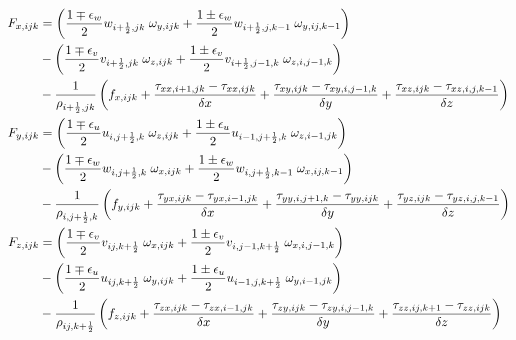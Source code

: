 \documentclass[11pt]{book}
\begin{document}
\begin{align}
F_{x,ijk} &=  \left(
 \frac{1\mp\epsilon_w}{2} w_{i+\frac{1}{2},jk} \; \omega_{y,ijk} +
 \frac{1\pm\epsilon_w}{2} w_{i+\frac{1}{2},j,k-1} \; \omega_{y,ij,k-1} \right) \nonumber \\
          &  - \left(
 \frac{1\mp\epsilon_v}{2} v_{i+\frac{1}{2},jk} \; \omega_{z,ijk} +
 \frac{1\pm\epsilon_v}{2} v_{i+\frac{1}{2},j-1,k} \; \omega_{z,i,j-1,k} \right) \nonumber\\
           &  - \frac{1}{\rho_{i+\frac{1}{2},jk}} \left( f_{x,ijk}
  + \frac{\tau_{xx,i+1,jk}-\tau_{xx,ijk}}{\delta x}
  + \frac{\tau_{xy,ijk}-\tau_{xy,i,j-1,k}}{\delta y}
  + \frac{\tau_{xz,ijk}-\tau_{xz,i,j,k-1}}{\delta z}  \right)  \\
F_{y,ijk} &= \left(
 \frac{1\mp\epsilon_u}{2} u_{i,j+\frac{1}{2},k} \; \omega_{z,ijk} +
 \frac{1\pm\epsilon_u}{2} u_{i-1,j+\frac{1}{2},k} \; \omega_{z,i-1,jk} \right) \nonumber \\
           &  - \left(
 \frac{1\mp\epsilon_w}{2} w_{i,j+\frac{1}{2},k} \; \omega_{x,ijk}+
 \frac{1\pm\epsilon_w}{2} w_{i,j+\frac{1}{2},k-1} \; \omega_{x,ij,k-1} \right) \nonumber \\
           &  - \frac{1}{\rho_{i,j+\frac{1}{2},k}} \left( f_{y,ijk}
  + \frac{\tau_{yx,ijk}-\tau_{yx,i-1,jk}}{\delta x}
  + \frac{\tau_{yy,i,j+1,k}-\tau_{yy,ijk}}{\delta y}
  + \frac{\tau_{yz,ijk}-\tau_{yz,i,j,k-1}}{\delta z} \right) \\
F_{z,ijk} &=  \left(
 \frac{1\mp\epsilon_v}{2} v_{ij,k+\frac{1}{2}} \; \omega_{x,ijk} +
 \frac{1\pm\epsilon_v}{2} v_{i,j-1,k+\frac{1}{2}} \; \omega_{x,i,j-1,k} \right)\nonumber \\
           &  -\left(
 \frac{1\mp\epsilon_u}{2} u_{ij,k+\frac{1}{2}} \; \omega_{y,ijk} +
 \frac{1\pm\epsilon_u}{2} u_{i-1,j,k+\frac{1}{2}} \; \omega_{y,i-1,jk} \right) \nonumber \\
           &  - \frac{1}{\rho_{ij,k+\frac{1}{2}}} \left( f_{z,ijk}
  + \frac{\tau_{zx,ijk}-\tau_{zx,i-1,jk}}{\delta x}
  + \frac{\tau_{zy,ijk}-\tau_{zy,i,j-1,k}}{\delta y}
  + \frac{\tau_{zz,ij,k+1}-\tau_{zz,ijk}}{\delta z} \right)
\end{align}
\end{document}
